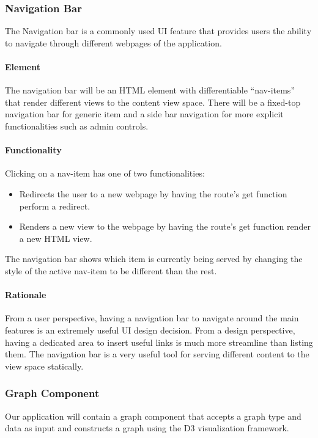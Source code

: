     \subsubsection{Navigation Bar}
        The Navigation bar is a commonly used UI feature that provides users the ability to navigate through different webpages of the application.
        \paragraph{Element}
            The navigation bar will be an HTML element with differentiable ``nav-items'' that render different views to the content view space. There will be a fixed-top navigation bar for generic item and a side bar navigation for more explicit functionalities such as admin controls. 
        \paragraph{Functionality}
            Clicking on a nav-item has one of two functionalities: 
            \begin{itemize}
                \item Redirects the user to a new webpage by having the route's get function perform a redirect.
                \item Renders a new view to the webpage by having the route's get function render a new HTML view.
            \end{itemize}
            The navigation bar shows which item is currently being served by changing the style of the active nav-item to be different than the rest.
        \paragraph{Rationale}
            From a user perspective, having a navigation bar to navigate around the main features is an extremely useful UI design decision. 
            From a design perspective, having a dedicated area to insert useful links is much more streamline than listing them. 
            The navigation bar is a very useful tool for serving different content to the view space statically.
    
    \subsubsection{Graph Component}
        Our application will contain a graph component that accepts a graph type and data as input and constructs a graph using the D3 visualization framework.
